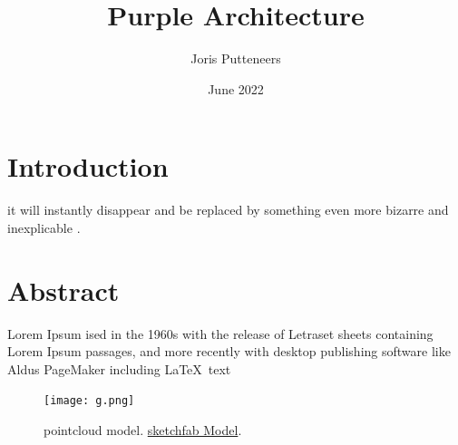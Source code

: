 \documentclass{article}
\title{\textbf{Purple Architecture}}
\author{Joris Putteneers}
\date{June 2022}
\begin{document}
\maketitle

\section{Introduction}
it will instantly disappear and be replaced by something even more bizarre and inexplicable \cite{databaseII}.


\section{Abstract}
Lorem Ipsum ised in the 1960s with the release of Letraset sheets containing Lorem Ipsum passages, and more recently with desktop publishing software like Aldus PageMaker including {\color{blue}\LaTeX\ text} \\ 

\begin{figure}[H]
  \centering
  \captionsetup{font=small,justification=raggedright,singlelinecheck=false}
  \texttt{[image: g.png]}
  \caption{pointcloud model. \href{https://sketchfab.com/3d-models/wifi-workspace-visualisation-aefe16a1f9bd4296941e099754eaacc2}{sketchfab Model}.}
  \label{fig:method}
\end{figure}
\end{document}
